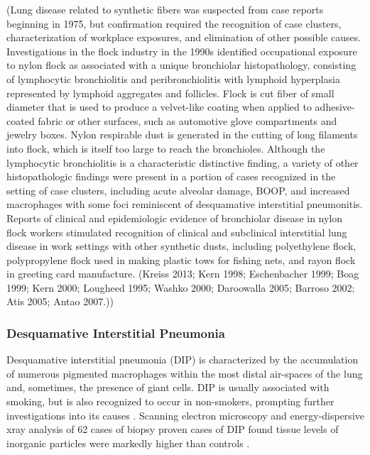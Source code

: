\documentclass[a4
er,12pt]{article}
\begin{document}
(Lung disease related to synthetic fibers was suspected from case reports beginning in 1975, but confirmation required the recognition of case clusters, characterization of workplace exposures, and elimination of other possible causes. Investigations in the flock industry in the 1990s identified occupational exposure to nylon flock as associated with a unique bronchiolar histopathology, consisting of lymphocytic bronchiolitis and peribronchiolitis with lymphoid hyperplasia
represented by lymphoid aggregates and follicles.  Flock is cut fiber of small diameter that is used to produce a velvet-like coating when applied to adhesive-coated fabric or other surfaces, such as automotive glove compartments and jewelry boxes.  Nylon respirable dust is generated in the cutting of long filaments into flock, which is itself too large to reach the bronchioles.  Although the lymphocytic bronchiolitis is a characteristic distinctive finding, a variety of other
histopathologic findings were present in a portion of cases recognized in the setting of case clusters, including acute alveolar damage, BOOP, and increased macrophages with some foci reminiscent of desquamative interstitial pneumonitis. Reports of clinical and epidemiologic evidence of bronchiolar disease in nylon flock workers stimulated recognition of clinical and subclinical interstitial lung disease in work settings with other synthetic dusts, including polyethylene flock,
polypropylene flock used in making plastic tows for fishing nets, and rayon flock in greeting card manufacture. (Kreiss 2013; Kern 1998; Eschenbacher 1999; Boag 1999; Kern 2000; Lougheed 1995; Washko 2000; Daroowalla 2005; Barroso 2002; Atis 2005; Antao 2007.))

\subsubsection{Desquamative Interstitial Pneumonia}
Desquamative interstitial pneumonia (DIP) is characterized by the accumulation of numerous pigmented macrophages within the most distal air-spaces of the lung and, sometimes, the presence of giant cells. DIP is usually associated with smoking, but is also recognized to occur in non-smokers, prompting further investigations into its causes \cite{Godbert2013}. Scanning electron microscopy and energy-dispersive xray analysis of 62 cases of biopsy proven cases of DIP found tissue levels of inorganic particles were markedly higher than controls \cite{Abraham1981}.
\end{document}
